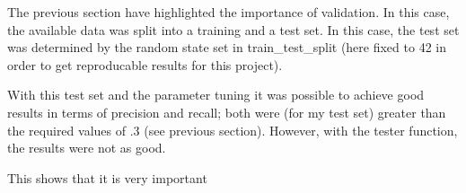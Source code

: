 \documentclass[11pt]{article} %
\begin{document}
The previous section have highlighted the importance of validation. In this case, the available data was split into a training and a test set. In this case, the test set was determined by the random state set in {\selectfont train\_test\_split} (here fixed to 42 in order to get reproducable results for this project). \medskip

With this test set and the parameter tuning it was possible to achieve good results in terms of precision and recall; both were (for my test set) greater than the required values of .3 (see previous section). However, with the tester function, the results were not as good.\medskip

This shows that it is very important 
\end{document}
